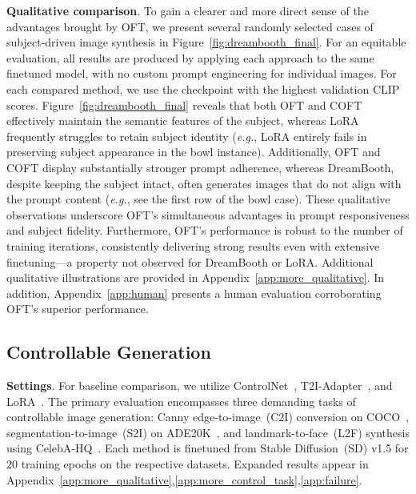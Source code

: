 \textbf{Qualitative comparison}. To gain a clearer and more direct sense of the advantages brought by OFT, we present several randomly selected cases of subject-driven image synthesis in Figure~\ref{fig:dreambooth_final}. For an equitable evaluation, all results are produced by applying each approach to the same finetuned model, with no custom prompt engineering for individual images. For each compared method, we use the checkpoint with the highest validation CLIP scores. Figure~\ref{fig:dreambooth_final} reveals that both OFT and COFT effectively maintain the semantic features of the subject, whereas LoRA frequently struggles to retain subject identity (\emph{e.g.}, LoRA entirely fails in preserving subject appearance in the bowl instance). Additionally, OFT and COFT display substantially stronger prompt adherence, whereas DreamBooth, despite keeping the subject intact, often generates images that do not align with the prompt content (\emph{e.g.}, see the first row of the bowl case). These qualitative observations underscore OFT’s simultaneous advantages in prompt responsiveness and subject fidelity. Furthermore, OFT’s performance is robust to the number of training iterations, consistently delivering strong results even with extensive finetuning—a property not observed for DreamBooth or LoRA. Additional qualitative illustrations are provided in Appendix~\ref{app:more_qualitative}. In addition, Appendix~\ref{app:human} presents a human evaluation corroborating OFT’s superior performance.

\subsection{Controllable Generation}

\textbf{Settings}. For baseline comparison, we utilize ControlNet~\cite{zhang2023adding}, T2I-Adapter~\cite{mou2023t2i}, and LoRA~\cite{hulora2022}. The primary evaluation encompasses three demanding tasks of controllable image generation: Canny edge-to-image~(C2I) conversion on COCO~\cite{lin2014microsoft}, segmentation-to-image~(S2I) on ADE20K~\cite{zhou2017scene}, and landmark-to-face~(L2F) synthesis using CelebA-HQ~\cite{karras2018progressive,xia2021tedigan}. Each method is finetuned from Stable Diffusion~(SD) v1.5 for 20 training epochs on the respective datasets. Expanded results appear in Appendix~\ref{app:more_qualitative},\ref{app:more_control_task},\ref{app:failure}.


